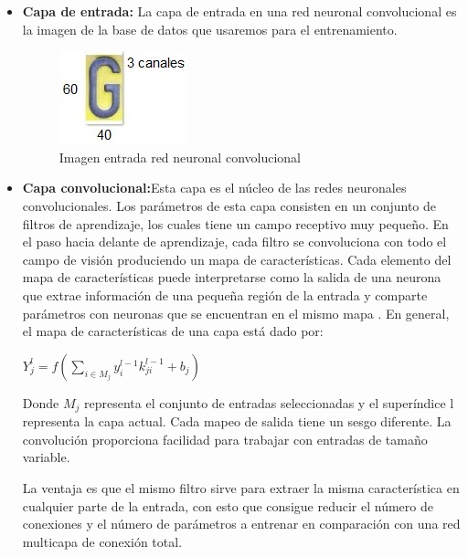 \begin{itemize}

\item \textbf{Capa de entrada:} La capa de entrada en una red neuronal convolucional es la imagen de la base de datos que usaremos para el entrenamiento. 

\begin{figure}[H]
    \centering
    \includegraphics[width=0.4\linewidth]{imagenes/imagen_entrada.jpg}
    \caption{Imagen entrada red neuronal convolucional
    \label{fig:imagen_entrada}}
\end{figure}

\item \textbf{Capa convolucional:}Esta capa es el núcleo de las redes neuronales convolucionales. Los parámetros de esta capa consisten en un conjunto de filtros de aprendizaje, los cuales tiene un campo receptivo muy pequeño. En el paso hacia delante de aprendizaje, cada filtro se convoluciona con todo el campo de visión produciendo un mapa de características. Cada elemento del mapa de características puede interpretarse como la salida de una neurona que extrae información de una pequeña región de la entrada y comparte parámetros con neuronas que se encuentran en el mismo mapa \cite{bouvrie2006notes}. En general, el mapa de características de una capa está dado por: 

\begin{center}
    $Y_{j}^l = f(\sum_{i\in M_{j}}y_{i}^{l-1}k_{ji}^{l-1} + b_{j})$
\end{center}

Donde $M_{j}$ representa el conjunto de entradas seleccionadas y el superíndice l representa la capa actual. Cada mapeo de salida tiene un sesgo diferente. La convolución proporciona facilidad para trabajar con entradas de tamaño variable.    

La ventaja es que el mismo filtro sirve para extraer la misma característica en cualquier parte de la entrada, con esto que consigue reducir el número de conexiones y el número de parámetros a entrenar en comparación con una red multicapa de conexión total.


\end{itemize}
